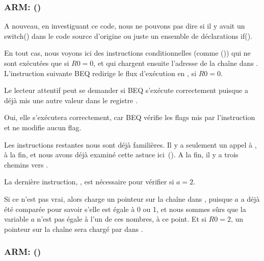 \subsubsection{ARM: \OptimizingKeilVI (\ARMMode)}



A nouveau, en investiguant ce code, nous ne pouvons pas dire si il y avait un switch()
dans le code source d'origine ou juste un ensemble de déclarations if().


En tout cas, nous voyons ici des instructions conditionnelles (comme \ADREQ ())
qui ne sont exécutées que si $R0=0$, et qui chargent ensuite l'adresse de la chaîne
 dans .
L'instruction suivante \ac{BEQ} redirige le flux d'exécution en , si $R0=0$.

Le lecteur attentif peut se demander si \ac{BEQ} s'exécute correctement puisque \ADREQ
a déjà mis une autre valeur dans le registre .

Oui, elle s'exécutera correctement, car \ac{BEQ} vérifie les flags mis par l'instruction
\CMP et \ADREQ ne modifie aucun flag.

Les instructions restantes nous sont déjà familières.
Il y a seulement un appel à \printf, à la fin, et nous avons déjà examiné cette
astuce ici~().
A la fin, il y a trois chemins vers \printf{}.

La dernière instruction, , est nécessaire pour vérifier si $a=2$.

Si ce n'est pas vrai, alors \ADRNE charge un pointeur sur la chaîne 
dans , puisque $a$ a déjà été comparée pour savoir s'elle est égale
à 0 ou 1, et nous sommes sûrs que la variable $a$ n'est pas égale à l'un de
ces nombres, à ce point.
Et si $R0=2$, un pointeur sur la chaîne  sera chargé
par \ADREQ dans .

\subsubsection{ARM: \OptimizingKeilVI (\ThumbMode)}



